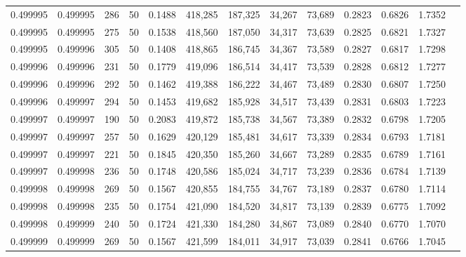 \begin{tabular}{rrrrrrrrrrrrr}
0.499995 & 0.499995 &   286 &  50 &                                     0.1488 & 418,285 & 187,325 &  34,267 &  73,689 & 0.2823 & 0.6826 & 1.7352 \\
0.499995 & 0.499995 &   275 &  50 &                                     0.1538 & 418,560 & 187,050 &  34,317 &  73,639 & 0.2825 & 0.6821 & 1.7327 \\
0.499995 & 0.499996 &   305 &  50 &                                     0.1408 & 418,865 & 186,745 &  34,367 &  73,589 & 0.2827 & 0.6817 & 1.7298 \\
0.499996 & 0.499996 &   231 &  50 &                                     0.1779 & 419,096 & 186,514 &  34,417 &  73,539 & 0.2828 & 0.6812 & 1.7277 \\
0.499996 & 0.499996 &   292 &  50 &                                     0.1462 & 419,388 & 186,222 &  34,467 &  73,489 & 0.2830 & 0.6807 & 1.7250 \\
0.499996 & 0.499997 &   294 &  50 &                                     0.1453 & 419,682 & 185,928 &  34,517 &  73,439 & 0.2831 & 0.6803 & 1.7223 \\
0.499997 & 0.499997 &   190 &  50 &                                     0.2083 & 419,872 & 185,738 &  34,567 &  73,389 & 0.2832 & 0.6798 & 1.7205 \\
0.499997 & 0.499997 &   257 &  50 &                                     0.1629 & 420,129 & 185,481 &  34,617 &  73,339 & 0.2834 & 0.6793 & 1.7181 \\
0.499997 & 0.499997 &   221 &  50 &                                     0.1845 & 420,350 & 185,260 &  34,667 &  73,289 & 0.2835 & 0.6789 & 1.7161 \\
0.499997 & 0.499998 &   236 &  50 &                                     0.1748 & 420,586 & 185,024 &  34,717 &  73,239 & 0.2836 & 0.6784 & 1.7139 \\
0.499998 & 0.499998 &   269 &  50 &                                     0.1567 & 420,855 & 184,755 &  34,767 &  73,189 & 0.2837 & 0.6780 & 1.7114 \\
0.499998 & 0.499998 &   235 &  50 &                                     0.1754 & 421,090 & 184,520 &  34,817 &  73,139 & 0.2839 & 0.6775 & 1.7092 \\
0.499998 & 0.499999 &   240 &  50 &                                     0.1724 & 421,330 & 184,280 &  34,867 &  73,089 & 0.2840 & 0.6770 & 1.7070 \\
0.499999 & 0.499999 &   269 &  50 &                                     0.1567 & 421,599 & 184,011 &  34,917 &  73,039 & 0.2841 & 0.6766 & 1.7045 \\

\end{tabular}
